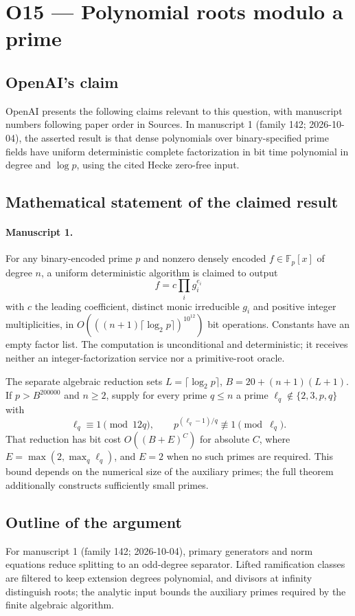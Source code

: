\documentclass[11pt]{article}
\begin{document}
\section*{O15 — Polynomial roots modulo a prime}

\subsection{OpenAI's claim}
OpenAI presents the following claims relevant to this question, with manuscript numbers following paper order in Sources. In manuscript 1 (family 142; 2026-10-04), the asserted result is that dense polynomials over binary-specified prime fields have uniform deterministic complete factorization in bit time polynomial in degree and $\log p$, using the cited Hecke zero-free input.

\subsection{Mathematical statement of the claimed result}
\paragraph{Manuscript 1.}
For any binary-encoded prime $p$ and nonzero densely encoded $f\in\mathbb F_p[x]$ of degree $n$, a uniform deterministic algorithm is claimed to output
\[
 f=c\prod_i g_i^{e_i}
\]
with $c$ the leading coefficient, distinct monic irreducible $g_i$ and positive integer multiplicities, in $O(((n+1)\lceil\log_2p\rceil)^{10^{12}})$ bit operations. Constants have an empty factor list. The computation is unconditional and deterministic; it receives neither an integer-factorization service nor a primitive-root oracle.

The separate algebraic reduction sets $L=\lceil\log_2p\rceil$, $B=20+(n+1)(L+1)$. If $p>B^{200000}$ and $n\ge2$, supply for every prime $q\le n$ a prime $\ell_q\notin\{2,3,p,q\}$ with
\[
 \ell_q\equiv1\pmod{12q},\qquad p^{(\ell_q-1)/q}\not\equiv1\pmod{\ell_q}.
\]
That reduction has bit cost $O((B+E)^C)$ for absolute $C$, where $E=\max(2,\max_q\ell_q)$, and $E=2$ when no such primes are required. This bound depends on the numerical size of the auxiliary primes; the full theorem additionally constructs sufficiently small primes.

\subsection{Outline of the argument}
For manuscript 1 (family 142; 2026-10-04), primary generators and norm equations reduce splitting to an odd-degree separator. Lifted ramification classes are filtered to keep extension degrees polynomial, and divisors at infinity distinguish roots; the analytic input bounds the auxiliary primes required by the finite algebraic algorithm.
\end{document}
